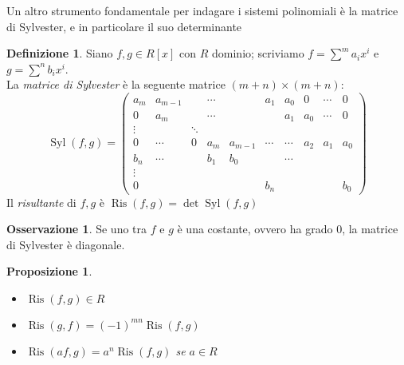 \documentclass[a4paper,10pt]{article}
\theoremstyle{plain}
\newtheorem{prop}[thm]{Proposizione}
\theoremstyle{definition}
\newtheorem{defn}{Definizione}[section]
\newtheorem*{oss}{Osservazione}
\DeclareMathOperator{\Syl}{Syl}
\DeclareMathOperator{\Ris}{Ris}
\begin{document}
Un altro strumento fondamentale per indagare i sistemi polinomiali è la matrice di Sylvester, e in particolare il suo determinante
\begin{defn}
    Siano $f,g\in R[x]$ con $R$ dominio; scriviamo $f=\sum^m a_ix^i$ e $g=\sum^n b_ix^i$.\\
    La \emph{matrice di Sylvester} è la seguente matrice $(m+n)\times(m+n)$:
    $$\Syl(f,g) = \begin{pmatrix}
    a_m & a_{m-1} & & \cdots & & a_1 & a_0 & 0 & \cdots & 0 \\
    0 & a_m & & \cdots & & & a_1 & a_0 & \cdots &  0 \\
    \vdots & & \ddots \\
    0 & \cdots & 0 & a_m & a_{m-1} & \cdots & \cdots & a_2 & a_1 & a_0 \\
    b_n & \cdots & & b_1 & b_0 & & \cdots\\
    \vdots\\
    0 & & & & & b_n & & & & b_0

    \end{pmatrix}$$
    Il \emph{risultante} di $f,g$ è $\Ris(f,g)=\det \Syl(f,g)$
\end{defn}
\begin{oss}
    Se uno tra $f$ e $g$ è una costante, ovvero ha grado $0$, la matrice di Sylvester è diagonale.
\end{oss}
\begin{prop}
    \begin{itemize}
        \item $\Ris(f,g)\in R$
        \item $\Ris(g,f)=(-1)^{mn}\Ris(f,g)$
        \item $\Ris(af,g)=a^n\Ris(f,g)$ se $a\in R$
    \end{itemize}
\end{prop}
\end{document}
